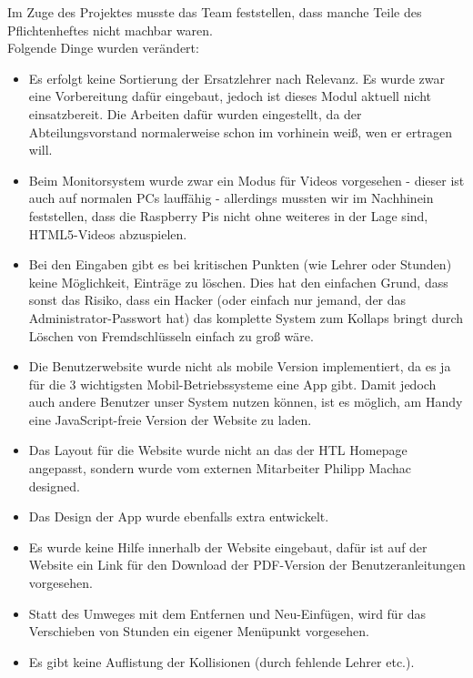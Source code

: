 Im Zuge des Projektes musste das Team feststellen, dass manche Teile des Pflichtenheftes nicht machbar waren.\\
Folgende Dinge wurden verändert:
\begin{itemize}
	\item Es erfolgt keine Sortierung der Ersatzlehrer nach Relevanz. Es wurde zwar eine Vorbereitung dafür eingebaut, jedoch ist dieses Modul aktuell nicht einsatzbereit. Die Arbeiten dafür wurden eingestellt, da der Abteilungsvorstand normalerweise schon im vorhinein weiß, wen er ertragen will.
	\item Beim Monitorsystem wurde zwar ein Modus für Videos vorgesehen - dieser ist auch auf normalen PCs lauffähig - allerdings mussten wir im Nachhinein feststellen, dass die Raspberry Pis nicht ohne weiteres in der Lage sind, HTML5-Videos abzuspielen.
	\item Bei den Eingaben gibt es bei kritischen Punkten (wie Lehrer oder Stunden) keine Möglichkeit, Einträge zu löschen. Dies hat den einfachen Grund, dass sonst das Risiko, dass ein Hacker (oder einfach nur jemand, der das Administrator-Passwort hat) das komplette System zum Kollaps bringt durch Löschen von Fremdschlüsseln einfach zu groß wäre.
	\item Die Benutzerwebsite wurde nicht als mobile Version implementiert, da es ja für die 3 wichtigsten Mobil-Betriebssysteme eine App gibt. Damit jedoch auch andere Benutzer unser System nutzen können, ist es möglich, am Handy eine JavaScript-freie Version der Website zu laden.
	\item Das Layout für die Website wurde nicht an das der HTL Homepage angepasst, sondern wurde vom externen Mitarbeiter Philipp Machac designed.
	\item Das Design der App wurde ebenfalls extra entwickelt.
	\item Es wurde keine Hilfe innerhalb der Website eingebaut, dafür ist auf der Website ein Link für den Download der PDF-Version der Benutzeranleitungen vorgesehen.
	\item Statt des Umweges mit dem Entfernen und Neu-Einfügen, wird für das Verschieben von Stunden ein eigener Menüpunkt vorgesehen.
	\item Es gibt keine Auflistung der Kollisionen (durch fehlende Lehrer etc.).
\end{itemize}